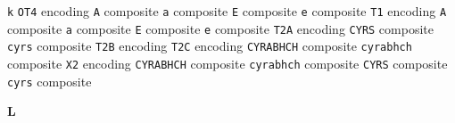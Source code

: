 \documentclass[twoside]{ltxdoc}
\makeatletter
\renewenvironment{theindex}{%
   \@restonecoltrue
   \if@twocolumn\@restonecolfalse\fi
   \columnseprule \z@
   \columnsep 35\p@
   \twocolumn[\index@prologue]%
   \IndexParms
   \let\item\@idxitem
   \ignorespaces
}{\if@restonecol\onecolumn\else\clearpage\fi}
\makeatother
\begin{document}
\begin{theindex}
  \item \texttt  {k}\efill 
    \subitem \texttt  {OT4} encoding\pfill {}
      \subsubitem \texttt  {A} composite\pfill {}
      \subsubitem \texttt  {a} composite\pfill {}
      \subsubitem \texttt  {E} composite\pfill {}
      \subsubitem \texttt  {e} composite\pfill {}
    \subitem \texttt  {T1} encoding\pfill {}
      \subsubitem \texttt  {A} composite\pfill {}
      \subsubitem \texttt  {a} composite\pfill {}
      \subsubitem \texttt  {E} composite\pfill {}
      \subsubitem \texttt  {e} composite\pfill {}
    \subitem \texttt  {T2A} encoding\pfill {}
      \subsubitem \texttt  {CYRS} composite\pfill 
      \subsubitem \texttt  {cyrs} composite\pfill 
    \subitem \texttt  {T2B} encoding\pfill {}
    \subitem \texttt  {T2C} encoding\pfill {}
      \subsubitem \texttt  {CYRABHCH} composite\pfill 
      \subsubitem \texttt  {cyrabhch} composite\pfill 
    \subitem \texttt  {X2} encoding\pfill {}
      \subsubitem \texttt  {CYRABHCH} composite\pfill 
      \subsubitem \texttt  {cyrabhch} composite\pfill 
      \subsubitem \texttt  {CYRS} composite\pfill 
      \subsubitem \texttt  {cyrs} composite\pfill 

  \indexspace
{\bfseries\hfil L\hfil}\nopagebreak


\end{theindex}
\end{document}
